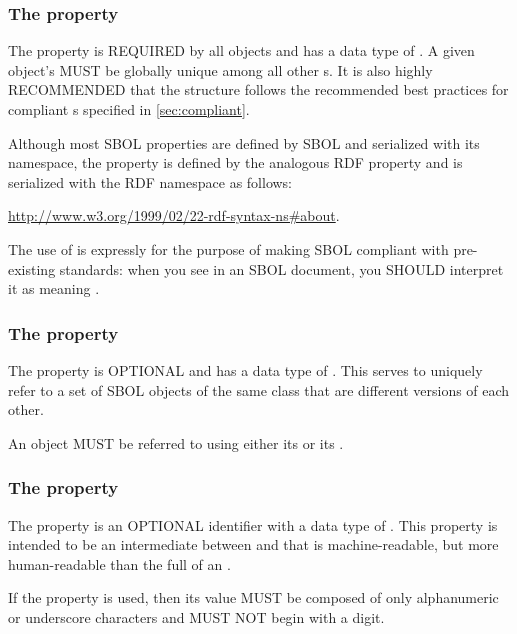 \subsubsection*{The  property}
\label{sec:identity}
The  property is REQUIRED by all  objects and has a data type of . A given  object's   MUST be globally unique among all other  s. It is also highly RECOMMENDED that the  structure follows the recommended best practices for compliant s specified in \ref{sec:compliant}.

Although most SBOL properties are defined by SBOL and serialized with its namespace, the  property is defined by the analogous RDF  property and is serialized with the RDF namespace as follows:

\url{http://www.w3.org/1999/02/22-rdf-syntax-ns\#about}.

The use of  is expressly for the purpose of making SBOL compliant with pre-existing standards: when you see  in an SBOL document, you SHOULD interpret it as meaning .

\subsubsection*{The  property}
\label{sec:persistentIdentity}
The  property is OPTIONAL and has a data type of . This  serves to uniquely refer to a set of SBOL objects of the same class that are different versions of each other.

An  object MUST be referred to using either its   or its  .

\subsubsection*{The  property}
\label{sec:displayId}
The  property is an OPTIONAL identifier with a data type of . This property is intended to be an intermediate between  and  that is machine-readable, but more human-readable than the full  of an .

If the  property is used, then its  value MUST be composed of only alphanumeric or underscore characters and MUST NOT begin with a digit.

